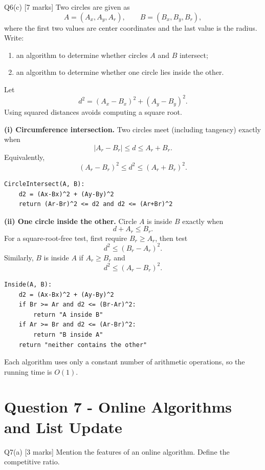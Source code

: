 \documentclass[10.5pt,a4paper]{article}
\begin{document}
\begin{questionbox}{Q6(c) [7 marks]}
Two circles are given as
\[
A=(A_x,A_y,A_r),\qquad B=(B_x,B_y,B_r),
\]
where the first two values are center coordinates and the last value is the radius. Write:
\begin{enumerate}[label=(\roman*)]
\item an algorithm to determine whether circles $A$ and $B$ intersect;
\item an algorithm to determine whether one circle lies inside the other.
\end{enumerate}
\end{questionbox}

\begin{answerbox}
Let
\[
d^2=(A_x-B_x)^2+(A_y-B_y)^2.
\]
Using squared distances avoids computing a square root.

\textbf{(i) Circumference intersection.} Two circles meet (including tangency) exactly when
\[
|A_r-B_r|\le d\le A_r+B_r.
\]
Equivalently,
\[
\boxed{(A_r-B_r)^2\le d^2\le(A_r+B_r)^2.}
\]

\begin{lstlisting}
CircleIntersect(A, B):
    d2 = (Ax-Bx)^2 + (Ay-By)^2
    return (Ar-Br)^2 <= d2 and d2 <= (Ar+Br)^2
\end{lstlisting}

\textbf{(ii) One circle inside the other.}
Circle $A$ is inside $B$ exactly when
\[
d+A_r\le B_r.
\]
For a square-root-free test, first require $B_r\ge A_r$, then test
\[
\boxed{d^2\le(B_r-A_r)^2.}
\]
Similarly, $B$ is inside $A$ if $A_r\ge B_r$ and
\[
d^2\le(A_r-B_r)^2.
\]

\begin{lstlisting}
Inside(A, B):
    d2 = (Ax-Bx)^2 + (Ay-By)^2
    if Br >= Ar and d2 <= (Br-Ar)^2:
        return "A inside B"
    if Ar >= Br and d2 <= (Ar-Br)^2:
        return "B inside A"
    return "neither contains the other"
\end{lstlisting}
Each algorithm uses only a constant number of arithmetic operations, so the running time is $O(1)$.
\end{answerbox}

\section{Question 7 - Online Algorithms and List Update}

\begin{questionbox}{Q7(a) [3 marks]}
Mention the features of an online algorithm. Define the competitive ratio.
\end{questionbox}
\end{document}
